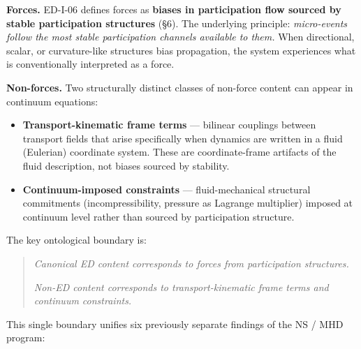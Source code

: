 \documentclass[
]{article}
\providecommand{\tightlist}{%
  \setlength{\itemsep}{0pt}\setlength{\parskip}{0pt}}
\begin{document}
\textbf{Forces.} ED-I-06 defines forces as \textbf{biases in
participation flow sourced by stable participation structures} (§6). The
underlying principle: \emph{micro-events follow the most stable
participation channels available to them.} When directional, scalar, or
curvature-like structures bias propagation, the system experiences what
is conventionally interpreted as a force.

\textbf{Non-forces.} Two structurally distinct classes of non-force
content can appear in continuum equations:

\begin{itemize}
\tightlist
\item
  \textbf{Transport-kinematic frame terms} --- bilinear couplings
  between transport fields that arise specifically when dynamics are
  written in a fluid (Eulerian) coordinate system. These are
  coordinate-frame artifacts of the fluid description, not biases
  sourced by stability.
\item
  \textbf{Continuum-imposed constraints} --- fluid-mechanical structural
  commitments (incompressibility, pressure as Lagrange multiplier)
  imposed at continuum level rather than sourced by participation
  structure.
\end{itemize}

The key ontological boundary is:

\begin{quote}
\emph{Canonical ED content corresponds to forces from participation
structures.}

\emph{Non-ED content corresponds to transport-kinematic frame terms and
continuum constraints.}
\end{quote}

This single boundary unifies six previously separate findings of the NS
/ MHD program:
\end{document}
